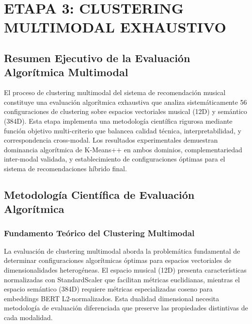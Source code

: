 \documentclass[12pt,a4paper]{report}
\begin{document}
\chapter{ETAPA 3: CLUSTERING MULTIMODAL EXHAUSTIVO}

\section{Resumen Ejecutivo de la Evaluación Algorítmica Multimodal}

El proceso de clustering multimodal del sistema de recomendación musical constituye una evaluación algorítmica exhaustiva que analiza sistemáticamente 56 configuraciones de clustering sobre espacios vectoriales musical (12D) y semántico (384D). Esta etapa implementa una metodología científica rigurosa mediante función objetivo multi-criterio que balancea calidad técnica, interpretabilidad, y correspondencia cross-modal. Los resultados experimentales demuestran dominancia algorítmica de K-Means++ en ambos dominios, complementariedad inter-modal validada, y establecimiento de configuraciones óptimas para el sistema de recomendaciones híbrido final.

\section{Metodología Científica de Evaluación Algorítmica}

\subsection{Fundamento Teórico del Clustering Multimodal}

La evaluación de clustering multimodal aborda la problemática fundamental de determinar configuraciones algorítmicas óptimas para espacios vectoriales de dimensionalidades heterogéneas. El espacio musical (12D) presenta características normalizadas con StandardScaler que facilitan métricas euclidianas, mientras el espacio semántico (384D) requiere métricas especializadas coseno para embeddings BERT L2-normalizados. Esta dualidad dimensional necesita metodología de evaluación diferenciada que preserve las propiedades distintivas de cada modalidad.
\end{document}

